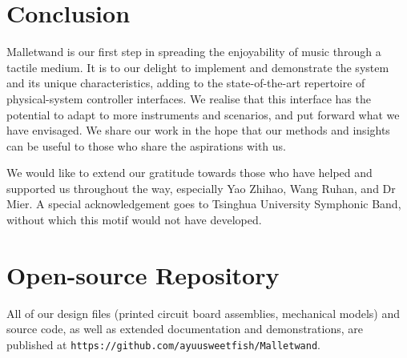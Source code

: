 \documentclass[manuscript,review]{acmart}
\begin{document}
\section{Conclusion}
Malletwand is our first step in spreading the enjoyability of music through a tactile medium. It is to our delight to implement and demonstrate the system and its unique characteristics, adding to the state-of-the-art repertoire of physical-system controller interfaces. We realise that this interface has the potential to adapt to more instruments and scenarios, and put forward what we have envisaged. We share our work in the hope that our methods and insights can be useful to those who share the aspirations with us.

\begin{acks}
We would like to extend our gratitude towards those who have helped and supported us throughout the way, especially Yao Zhihao, Wang Ruhan, and Dr Mier. A special acknowledgement goes to Tsinghua University Symphonic Band, without which this motif would not have developed.
\end{acks}




\appendix

\section{Open-source Repository}
All of our design files (printed circuit board assemblies, mechanical models) and source code, as well as extended documentation and demonstrations, are published at \texttt{https://github.com/ayuusweetfish/Malletwand}.
\end{document}
